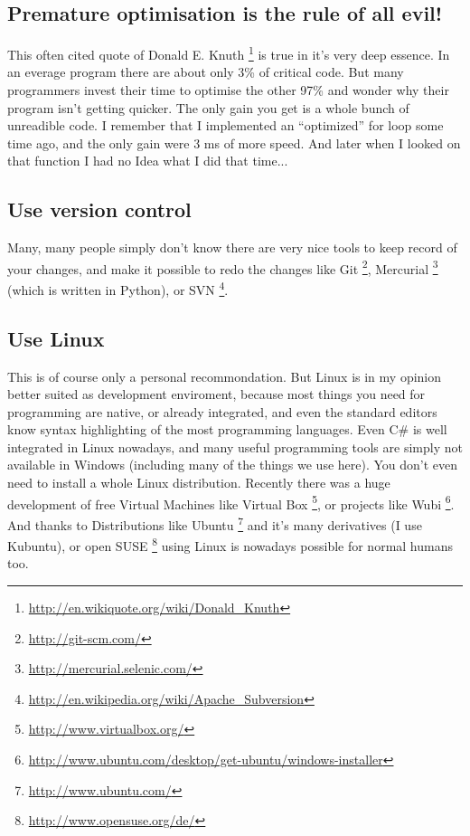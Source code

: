 \documentclass[letterpaper,10pt,english]{manual}
\begin{document}
\subsection{Premature optimisation is the rule of all evil!}

This often cited quote of Donald E. Knuth \footnote{
\href{http://en.wikiquote.org/wiki/Donald\_Knuth}{http://en.wikiquote.org/wiki/Donald\_Knuth}
} is true in it's very deep essence. In an everage program
there are about only 3\% of critical code. But many programmers invest their time to optimise the
other 97\% and wonder why their program isn't getting quicker. The only gain you get is a whole bunch
of unreadible code. I remember that I implemented an ``optimized'' for loop some time ago, and the only gain were
3 ms of more speed. And later when I looked on that function I had no Idea what I did that time...


\subsection{Use version control}

Many, many people simply don't know there are very nice
tools to keep record of your changes, and make it possible
to redo the changes like Git \footnote{
\href{http://git-scm.com/}{http://git-scm.com/}
}, Mercurial \footnote{
\href{http://mercurial.selenic.com/}{http://mercurial.selenic.com/}
} (which is written in Python),
or SVN \footnote{
\href{http://en.wikipedia.org/wiki/Apache\_Subversion}{http://en.wikipedia.org/wiki/Apache\_Subversion}
}.


\subsection{Use Linux}

This is of course only a personal recommondation. But Linux is in my opinion better
suited as development enviroment, because most things you need for programming are native, or
already integrated, and even the standard editors know syntax highlighting of the most programming
languages. Even C\# is well integrated in Linux nowadays, and many useful programming tools are simply not
available in Windows (including many of the things we use here).
You don't even need to install a whole Linux distribution. Recently there was a huge development of free
Virtual Machines like Virtual Box \footnote{
\href{http://www.virtualbox.org/}{http://www.virtualbox.org/}
}, or projects like Wubi \footnote{
\href{http://www.ubuntu.com/desktop/get-ubuntu/windows-installer}{http://www.ubuntu.com/desktop/get-ubuntu/windows-installer}
}. And thanks to Distributions like
Ubuntu \footnote{
\href{http://www.ubuntu.com/}{http://www.ubuntu.com/}
}  and it's many derivatives (I use Kubuntu), or open SUSE \footnote{
\href{http://www.opensuse.org/de/}{http://www.opensuse.org/de/}
} using Linux is nowadays possible for
normal humans too.
\end{document}
